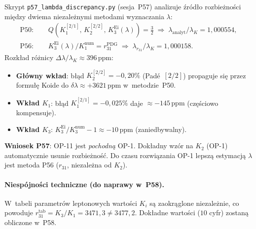 Skrypt \texttt{p57\_lambda\_discrepancy.py} (sesja~P57) analizuje \'zr\'od\l{}o
rozbie\.zno\'sci mi\k{e}dzy dwiema niezale\.znymi metodami wyznaczania $\lambda$:
\begin{align}
  \text{P50: } &\quad Q(K_1^{[2/1]},\,K_2^{[2/2]},\,K_3^{\mathrm{Ei}}(\lambda))
               = \tfrac{3}{2}
               \;\Rightarrow\; \lambda_\mathrm{analyt}/\lambda_K = 1{,}000554,
  \\
  \text{P56: } &\quad K_3^{\mathrm{Ei}}(\lambda)/K_1^{\mathrm{num}}
               = r_{31}^{\mathrm{PDG}}
               \;\Rightarrow\; \lambda_{r_{31}}/\lambda_K = 1{,}000158.
\end{align}
Rozk\l{}ad r\'o\.znicy $\Delta\lambda/\lambda_K\approx396\,\mathrm{ppm}$:
\begin{itemize}
  \item \textbf{G\l{}\'owny wk\l{}ad}: b\l{}\k{a}d $K_2^{[2/2]}=-0{,}20\%$
        (Pad\'e~$[2/2]$) propaguje si\k{e} przez formu\l{}\k{e} Koide
        do $\delta\lambda\approx+3621\,\mathrm{ppm}$ w~metodzie~P50.
  \item \textbf{Wk\l{}ad $K_1$}: b\l{}\k{a}d $K_1^{[2/1]}=-0{,}025\%$
        daje $\approx-145\,\mathrm{ppm}$ (cz\k{e}\'sciowo kompensuje).
  \item \textbf{Wk\l{}ad $K_3$}: $K_3^{\mathrm{Ei}}/K_3^{\mathrm{num}}-1
        \approx-10\,\mathrm{ppm}$ (zaniedbywalny).
\end{itemize}
\textbf{Wniosek P57}: OP-11 jest \emph{pochodn\k{a}} OP-1.
Dok\l{}adny wzór na $K_2$ (OP-1) automatycznie usunie rozbie\.zno\'s\'c.
Do czasu rozwi\k{a}zania OP-1 lepsz\k{a} estymacj\k{a} $\lambda$ jest
metoda P56 ($r_{31}$, niezale\.zna od $K_2$).

\paragraph{Niespójno\'sci techniczne (do naprawy w~P58).}
W~tabeli parametr\'ow leptonowych warto\'sci $K_i$ s\k{a} zaokr\k{a}glone
niezale\.znie, co powoduje $r_{31}^{\mathrm{tab}}=K_3/K_1=3471{,}3\neq3477{,}2$.
Dok\l{}adne warto\'sci ($10$ cyfr) zostan\k{a} obliczone w~P58.

